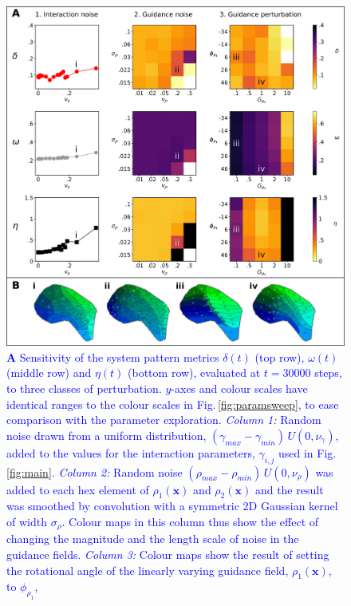 \documentclass[9pt,lineno,draft]{elife}
\newcommand{\cmnt}[1]{\textcolor{blue}{#1}}
\newcommand{\mb}[1]{\mathbf{#1}}
\begin{document}
\begin{figure}
  \begin{fullwidth}
    \includegraphics[width=\linewidth]{./Fig3.png}
    \caption{
      \cmnt{\textbf{A} Sensitivity of the system pattern
        metrics $\delta(t)$ (top row), $\omega(t)$ (middle row) and $\eta(t)$
        (bottom row), evaluated at $t=30000$ steps,
        to three classes of perturbation. $y$-axes and colour scales have identical ranges
        to the colour scales in Fig.\,\ref{fig:paramsweep}, to ease comparison
        with the parameter exploration.
        \emph{Column 1:} Random noise drawn from a uniform distribution,
        $(\gamma_{max}-\gamma_{min})\,U(0,\nu_\gamma)$, added
        to the values for the interaction parameters, $\gamma_{i,j}$ used in
        Fig.\,\ref{fig:main}.
        \emph{Column 2:} Random noise $(\rho_{max} - \rho_{min})\,U(0, \nu_{\rho})$
        was added to each hex element of $\rho_1(\mb{x})$ and $\rho_2(\mb{x})$ and the result
        was smoothed by convolution with a symmetric 2D
        Gaussian kernel of width $\sigma_\rho$. Colour maps in this column
        thus show the effect of changing the magnitude and the length scale of
        noise in the guidance fields.
        \emph{Column 3:} Colour maps show the result of setting the rotational angle
        of the linearly varying guidance field, $\rho_1(\mb{x})$, to $\phi_{\rho_1}$,
}}
\end{fullwidth}
\end{figure}
\end{document}
